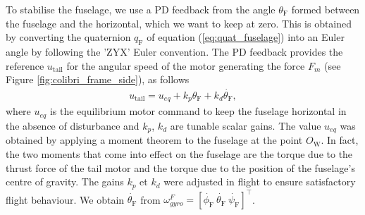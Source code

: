To stabilise the fuselage, we use a PD feedback from the angle $\theta_{\text{F}}$ formed between the fuselage and the horizontal, which we want to keep at zero. This is obtained by converting the quaternion $q_{\text{F}}$ of equation (\ref{eq:quat_fuselage}) into an Euler angle by following the 'ZYX' Euler convention. The PD feedback provides the reference $u_{\text{tail}}$ for the angular speed of the motor generating the force $F_{m}$ (see Figure  \ref{fig:colibri_frame_side}), as follows
\begin{align*}
    u_{\text{tail}} = u_{eq} + k_{p} \theta_{\text{F}} + k_{d} \dot{\theta_{\text{F}}},
\end{align*}
where $u_{eq}$ is the equilibrium motor command to keep the fuselage horizontal in the absence of disturbance and $k_{p}$, $k_{d}$ are tunable scalar gains. The value $u_{eq}$ was obtained by applying a moment theorem to the fuselage at the point $O_{\text{W}}$. In fact, the two moments that come into effect on the fuselage are the torque due to the thrust force of the tail motor and the torque due to the position of the fuselage's centre of gravity.
The gains $k_{p}$ et $k_{d}$ were adjusted in flight to ensure satisfactory flight behaviour. We obtain $\dot{\theta_{\text{F}}}$ from $\omega_{gyro}^{F} = [\dot{\phi_{\text{F}}}~\dot{\theta_{\text{F}}}~\dot{\psi_{\text{F}}}]^\top$.
